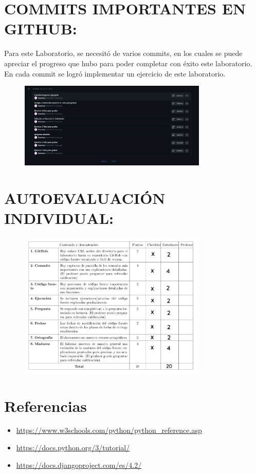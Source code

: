 \documentclass{article}
\begin{document}
\begin{enumerate}
		\section{COMMITS IMPORTANTES EN GITHUB:}
		Para este Laboratorio, se necesitó de varios commits, en los cuales se puede apreciar el progreso que hubo para poder completar con éxito este laboratorio. En cada commit se logró implementar un ejercicio de este laboratorio.
		\begin{figure}[H]
			\centering
			\includegraphics[width=0.8\textwidth,keepaspectratio]{img/Commits.png}
		\end{figure}
		\section{AUTOEVALUACIÓN INDIVIDUAL:}
		\begin{figure}[H]
			\centering
			\includegraphics[width=0.8\textwidth,keepaspectratio]{img/Autocalificacion.png}
		\end{figure}
	\end{enumerate}
	\section{Referencias}
	\begin{itemize}			
		
		\item \url{https://www.w3schools.com/python/python_reference.asp}
		\item \url{https://docs.python.org/3/tutorial/}
		\item \url{https://docs.djangoproject.com/es/4.2/}
	\end{itemize}
	
\end{document}
